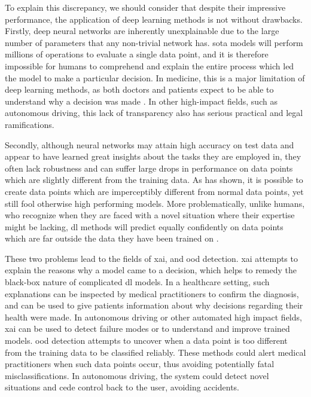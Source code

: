 \documentclass[UKenglish]{uiomasterthesis} %
\theoremstyle{definition}
\begin{document}
To explain this discrepancy, we should consider that despite their impressive performance, the application of deep learning methods is not without drawbacks. Firstly, deep neural networks are inherently unexplainable due to the large number of parameters that any non-trivial network has. \ac{sota} models will perform millions of operations to evaluate a single data point, and it is therefore impossible for humans to comprehend and explain the entire process which led the model to make a particular decision. In medicine, this is a major limitation of deep learning methods, as both doctors and patients expect to be able to understand why a decision was made \cite{tingsim}. In other high-impact fields, such as autonomous driving, this lack of transparency also has serious practical and legal ramifications. %

Secondly, although neural networks may attain high accuracy on test data and appear to have learned great insights about the tasks they are employed in, they often lack robustness and can suffer large drops in performance on data points which are slightly different from the training data. As \cite{intriguing} has shown, it is possible to create data points which are imperceptibly different from normal data points, yet still fool otherwise high performing models. More problematically, unlike humans, who recognize when they are faced with a novel situation where their expertise might be lacking, \ac{dl} methods will predict equally confidently on data points which are far outside the data they have been trained on \cite{tingsim}.

These two problems lead to the fields of \ac{xai}, and \ac{ood} detection. \ac{xai} attempts to explain the reasons why a model came to a decision, which helps to remedy the black-box nature of complicated \ac{dl} models. In a healthcare setting, such explanations can be inspected by medical practitioners to confirm the diagnosis, and can be used to give patients information about why decisions regarding their health were made. In autonomous driving or other automated high impact fields, \ac{xai} can be used to detect failure modes or to understand and improve trained models. \ac{ood} detection attempts to uncover when a data point is too different from the training data to be classified reliably. These methods could alert medical practitioners when such data points occur, thus avoiding potentially fatal misclassifications. In autonomous driving, the system could detect novel situations and cede control back to the user, avoiding accidents.
\end{document}
